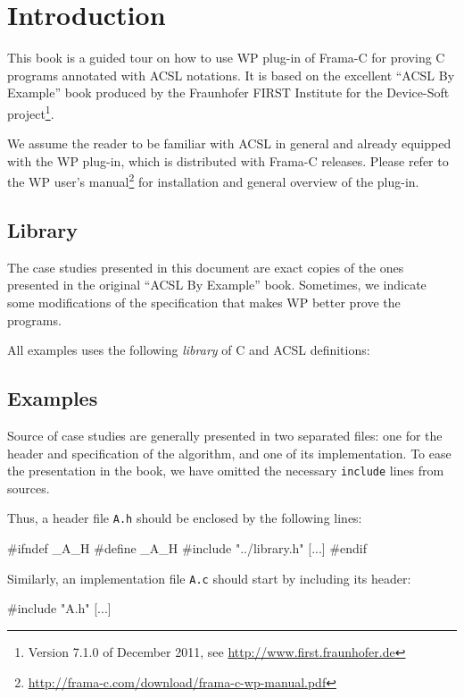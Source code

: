 \chapter{Introduction}

This book is a guided tour on how to use \textsf{WP} plug-in of
\textsf{Frama-C} for proving \textsf{C} programs annotated with
\textsf{ACSL} notations. It is based on the excellent ``ACSL By
Example'' book produced by the Fraunhofer FIRST Institute for 
the Device-Soft project\footnote{Version 7.1.0 of December 2011, 
  see \url{http://www.first.fraunhofer.de}}.

We assume the reader to be familiar with \textsf{ACSL} in general and
already equipped with the \textsf{WP} plug-in, which is distributed
with \textsf{Frama-C} releases. Please refer to the \textsf{WP} user's
manual\footnote{\url{http://frama-c.com/download/frama-c-wp-manual.pdf}}
for installation and general overview of the plug-in.

\section{Library}

The case studies presented in this document are exact copies of the
ones presented in the original ``ACSL By Example'' book. Sometimes, we
indicate some modifications of the specification that makes
\textsf{WP} better prove the programs.

All examples uses the following \emph{library} of \textsf{C} and
\textsf{ACSL} definitions:


\section{Examples}

Source of case studies are generally presented in two separated files:
one for the header and specification of the algorithm, and one of its
implementation.  To ease the presentation in the book, we have omitted
the necessary \texttt{include} lines from sources.

Thus, a header file \texttt{A.h} should be enclosed by the following lines:
\begin{ccode}
  #ifndef _A_H
  #define _A_H
  #include "../library.h"
  [...]
  #endif
\end{ccode}

Similarly, an implementation file \texttt{A.c} should start by including its header:
\begin{ccode}
  #include "A.h"
  [...]
\end{ccode}
